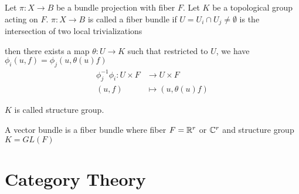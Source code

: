 \begin{definition}
	Let $\pi: X \to B$ be a bundle projection with fiber $F$. Let $K$ be a topological group acting on $F$. $\pi: X \to B$ is called a fiber bundle if $U = U_i \cap U_j \neq \emptyset$ is the intersection of two local trivializations
	\begin{center}
	\end{center}
	then there exists a map $\theta: U \to K$ such that restricted to $U$, we have $\phi_i(u, f) = \phi_j(u, \theta(u) f)$
	\begin{align*}
		\phi_j^{-1} \phi_i: U \times F &\to U \times F \\
		(u, f) &\mapsto (u, \theta(u)f)
	\end{align*}
	
	$K$ is called structure group.
\end{definition}

\begin{definition}
	A vector bundle is a fiber bundle where fiber $F = \mathbb{R}^r$ or $\mathbb{C}^r$ and structure group $K = GL(F)$
\end{definition}

\section{Category Theory}

\begin{definition}
\end{definition}

\begin{definition}[adjunction]
\end{definition}